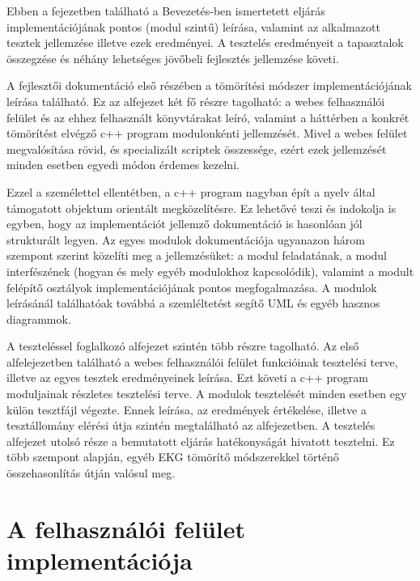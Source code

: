 \documentclass[oneside,titlepage,12pt,a4paper]{report}
\begin{document}
Ebben a fejezetben található a Bevezetés-ben ismertetett eljárás implementációjának pontos (modul szintű) leírása, valamint az alkalmazott tesztek jellemzése illetve ezek eredményei. A tesztelés eredményeit a tapasztalok összegzése és néhány lehetséges jövőbeli fejlesztés jellemzése követi. \par A fejlesztői dokumentáció első részében a tömörítési módszer implementációjának leírása található. Ez az alfejezet két fő részre tagolható: a webes felhasználói felület és az ehhez felhasznált könyvtárakat leíró, valamint a háttérben a konkrét tömörítést elvégző c++ program modulonkénti jellemzését. Mivel a webes felület megvalósítása rövid, és specializált scriptek összessége, ezért ezek jellemzését minden esetben egyedi módon érdemes kezelni. 
\par Ezzel a személettel ellentétben, a c++ program nagyban épít a nyelv által támogatott objektum orientált megközelítésre. Ez lehetővé teszi és indokolja is egyben, hogy az implementációt jellemző dokumentáció is hasonlóan jól strukturált legyen. Az egyes modulok dokumentációja ugyanazon három szempont szerint közelíti meg a jellemzésüket: a modul feladatának, a modul interfészének (hogyan és mely egyéb modulokhoz kapcsolódik), valamint a modult felépítő osztályok implementációjának pontos megfogalmazása. A modulok leírásánál találhatóak továbbá a szemléltetést segítő UML és egyéb hasznos diagrammok. 
\par  A teszteléssel foglalkozó alfejezet szintén több részre tagolható. Az első alfelejezetben található a webes felhasználói felület funkcióinak tesztelési terve, illetve az egyes tesztek eredményeinek leírása. Ezt követi a c++ program moduljainak részletes tesztelési terve. A modulok tesztelését minden esetben egy külön tesztfájl végezte. Ennek leírása, az eredmények értékelése, illetve a tesztállomány elérési útja szintén megtalálható az alfejezetben. A  tesztelés alfejezet utolsó része a bemutatott eljárás hatékonyságát hivatott tesztelni. Ez több szempont alapján, egyéb EKG tömörítő módszerekkel történő összehasonlítás útján valósul meg. 

\section{A felhasználói felület implementációja}
\end{document}
